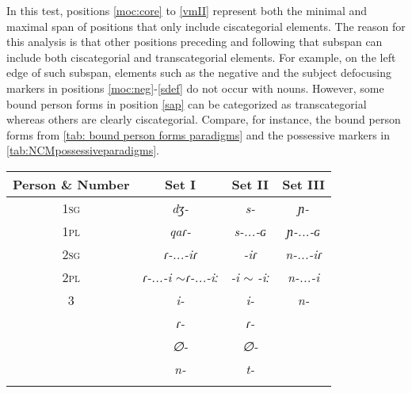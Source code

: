 \documentclass[output=paper]{langscibook}
\begin{document}
In this test, positions \ref{moc:core} to \ref{vmII} represent both the minimal and maximal span of positions that only include ciscategorial elements. The reason for this analysis is that other positions preceding and following that subspan can include both ciscategorial and transcategorial elements. For example, on the left edge of such subspan, elements such as the negative and the subject defocusing markers in positions \ref{moc:neg}-\ref{sdef} do not occur with nouns. However, some bound person forms in position \ref{sap} can be categorized as transcategorial whereas others are clearly ciscategorial. Compare, for instance, the bound person forms from \autoref{tab: bound person forms paradigms} and the possessive markers in \autoref{tab:NCMpossessiveparadigms}.

\begin{table}
\label{tab: bound person forms paradigms}
\begin{tabular}{cccc}
\lsptoprule
\textbf{Person \& Number} &  \textbf{Set I }&   \textbf{Set II} & \textbf{Set III }         \\\midrule
\textsc{1sg} &   \textit{dʒ-} &  \textit{s-} & \textit{ɲ-}\\
\textsc{1pl} &   \textit{qaɾ-} & \textit{s-...-ɢ}& \textit{ɲ-...-ɢ}\\
\textsc{2sg} &\textit{ɾ-...-iɾ} &\textit{-iɾ} & \textit{n-...-iɾ}\\
\textsc{2pl} &  \textit{ɾ-...-i} $\sim$\textit{ɾ-...-iː} &  \textit{-i} $\sim$ \textit{-iː} & \textit{n-...-i} \\
\textsc{3} & \textit{i-} & \textit{i-} &\textit{n-} \\
 & \textit{ɾ-} &  \textit{ɾ-} &\\
 & \textit{∅-} &   \textit{∅-} &\\
  & \textit{n-}&  \textit{t-} &\\
\lspbottomrule
\end{tabular}
\end{table}
%
\end{document}
